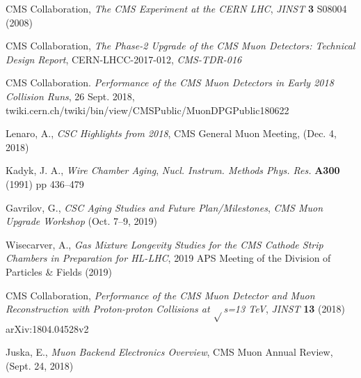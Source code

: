 \documentclass[a4paper,11pt]{article}
\begin{document}
\begin{thebibliography}{99}
 CMS Collaboration, \emph{The CMS Experiment at the CERN LHC}, \emph{JINST} {\bf 3} S08004 (2008)

 CMS Collaboration,
\emph{The Phase-2 Upgrade of the CMS Muon Detectors: Technical Design Report},
CERN-LHCC-2017-012, \emph{CMS-TDR-016}

CMS Collaboration. \emph{Performance of the CMS Muon Detectors in Early 2018 Collision Runs}, 26 Sept. 2018, twiki.cern.ch/twiki/bin/view/CMSPublic/MuonDPGPublic180622

Lenaro, A., \emph{CSC Highlights from 2018}, CMS General Muon Meeting, (Dec. 4, 2018)

Kadyk, J. A., \emph{Wire Chamber Aging}, \emph{Nucl. Instrum. Methods Phys. Res.} {\bf A300} (1991) pp 436--479

Gavrilov, G., \emph{CSC Aging Studies and Future Plan/Milestones}, \emph{CMS Muon Upgrade Workshop} (Oct. 7--9, 2019)

Wisecarver, A., \emph{Gas Mixture Longevity Studies for the CMS Cathode Strip Chambers in Preparation for HL-LHC}, 2019 APS Meeting of the Division of Particles \& Fields (2019)

CMS Collaboration, \emph{Performance of the {CMS} Muon Detector and Muon Reconstruction with Proton-proton Collisions at $\sqrt{}$s=13 {TeV}},
\emph{JINST} {\bf 13} (2018)
arXiv:1804.04528v2

Juska, E., \emph{Muon Backend Electronics Overview}, CMS Muon Annual Review, (Sept. 24, 2018)





\end{thebibliography}
\end{document}
